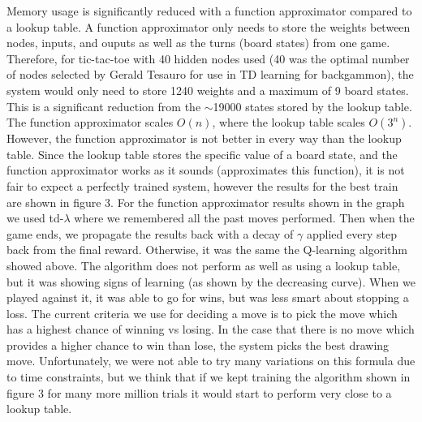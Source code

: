 \documentclass[12pt,a4paper]{article}
\begin{document}
Memory usage is significantly reduced with a function approximator compared to a lookup table. A function approximator only needs to store the weights between nodes, inputs, and ouputs as well as the turns (board states) from one game. Therefore, for tic-tac-toe with 40 hidden nodes used (40 was the optimal number of nodes selected by Gerald Tesauro for use in TD learning for backgammon), the system would only need to store 1240 weights and a maximum of 9 board states. This is a significant reduction from the $\sim$19000 states stored by the lookup table. The function approximator scales $O(n)$, where the lookup table scales $O(3^{n})$. However, the function approximator is not better in every way than the lookup table. Since the lookup table stores the specific value of a board state, and the function approximator works as it sounds (approximates this function), it is not fair to expect a perfectly trained system, however the results for the best train are shown in figure 3. For the function approximator results shown in the graph we used td-$\lambda$ where we remembered all the past moves performed. Then when the game ends, we propagate the results back with a decay of $\gamma$ applied every step back from the final reward. Otherwise, it was the same the Q-learning algorithm showed above. The algorithm does not perform as well as using a lookup table, but it was showing signs of learning (as shown by the decreasing curve). When we played against it, it was able to go for wins, but was less smart about stopping a loss. The current criteria we use for deciding a move is to pick the move which has a highest chance of winning vs losing. In the case that there is no move which provides a higher chance to win than lose, the system picks the best drawing move. Unfortunately, we were not able to try many variations on this formula due to time constraints, but we think that if we kept training the algorithm shown in figure 3 for many more million trials it would start to perform very close to a lookup table. 
\end{document}
